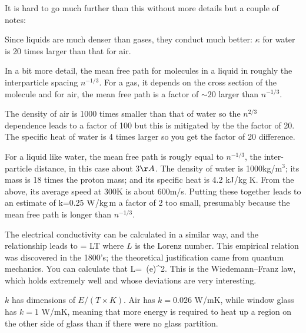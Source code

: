 \documentclass[11pt]{book}
\begin{document}
It is hard to go much further than this without more details but a couple of notes:
\bee
\item Since liquids are much denser than gases, they conduct much better: $\kappa$ for water is 20 times larger than that for air.
\item In a bit more detail, the mean free path for molecules in a liquid in roughly the interparticle spacing $n^{-1/3}$. For a gas, it depends on the cross section of the molecule and for air, the mean free path is a factor of $\sim 20$ larger than $n^{-1/3}$.
\item The density of air is 1000 times smaller than that of water so the $n^{2/3}$ dependence leads to a factor of 100 but this is mitigated by the the factor of 20. The specific heat of water is 4 times larger so you get the factor of 20 difference.
\item For a liquid like water, the mean free path is rougly equal to $n^{-1/3}$, the inter-particle distance, in this case about 3$\AA$. The density of water is 1000kg/m$^3$; its mass is 18 times the proton mass; and its specific heat is 4.2 kJ/kg K. From the above, its average speed at 300K is about 600m/s. Putting these together leads to an estimate of
\be
k=0.25 {\rm W/kg\,m}\ee
a factor of 2 too small, presumably because the mean free path is longer than $n^{-1/3}$.
\item The electrical conductivity can be calculated in a similar way, and the relationship leads to
\be
\frac{\kappa}{\sigma} = LT\ee
where $L$ is the Lorenz number. This empirical relation was discovered in the 1800's; the theoretical justification came from quantum mechanics. You can calculate that
\be
L= \,\left(e\right)^2.\ee
This is the Wiedemann–Franz law, which holds extremely well and whose deviations are very interesting.
\eee


$k$ has dimensions of $E/(T\times K)$. Air has $k=0.026$ W/mK, while window glass has $k=1$ W/mK, meaning that more energy is required to heat up a region on the other side of glass than if there were no glass partition.

\end{document}
